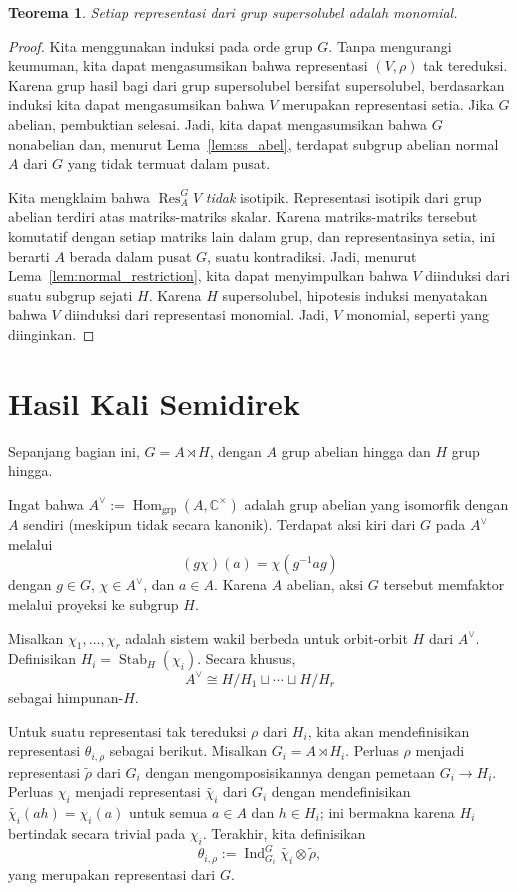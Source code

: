 \documentclass[12pt]{article}
\theoremstyle{plain}
\newtheorem{theorem}{Teorema}[section]
\theoremstyle{definition}
\theoremstyle{remark}
\numberwithin{equation}{section}
\begin{document}
\begin{theorem} \label{thm:ss_monomial}
Setiap representasi dari grup supersolubel adalah monomial.
\end{theorem}

\begin{proof}
Kita menggunakan induksi pada orde grup $G$.
Tanpa mengurangi keumuman, kita dapat mengasumsikan bahwa representasi
$(V,\rho)$ tak tereduksi.
Karena grup hasil bagi dari grup supersolubel bersifat supersolubel,
berdasarkan induksi kita dapat mengasumsikan bahwa $V$ merupakan representasi setia.
Jika $G$ abelian, pembuktian selesai.
Jadi, kita dapat mengasumsikan bahwa $G$ nonabelian dan, menurut Lema~\ref{lem:ss_abel},
terdapat subgrup abelian normal $A$ dari $G$ yang tidak termuat dalam pusat.

Kita mengklaim bahwa $\operatorname{Res}^G_A V$ \emph{tidak} isotipik.
Representasi isotipik dari grup abelian terdiri atas matriks-matriks
skalar. Karena matriks-matriks tersebut komutatif dengan setiap matriks lain dalam grup,
dan representasinya setia, ini berarti $A$ berada dalam pusat
$G$, suatu kontradiksi.
Jadi, menurut Lema~\ref{lem:normal_restriction},
kita dapat menyimpulkan bahwa $V$ diinduksi dari suatu subgrup sejati $H$.
Karena $H$ supersolubel, hipotesis induksi menyatakan bahwa
$V$ diinduksi dari representasi monomial.
Jadi, $V$ monomial, seperti yang diinginkan.
\end{proof}

\section{Hasil Kali Semidirek}

Sepanjang bagian ini, $G = A \rtimes H$,
dengan $A$ grup abelian hingga dan $H$ grup hingga.

Ingat bahwa $A^\vee :=
\operatorname{Hom}_{\mathrm{grp}}(A,\mathbb{C}^\times)$
adalah grup abelian yang isomorfik dengan $A$ sendiri (meskipun tidak
secara kanonik).
Terdapat aksi kiri dari $G$ pada $A^\vee$ melalui
\[
(g\chi)(a)=\chi(g^{-1}ag)
\]
dengan $g \in G$, $\chi \in A^\vee$, dan $a \in A$.
Karena $A$ abelian, aksi $G$ tersebut memfaktor melalui proyeksi
ke subgrup $H$.

Misalkan $\chi_1,\ldots, \chi_r$ adalah sistem wakil berbeda
untuk orbit-orbit $H$ dari $A^\vee$. Definisikan
$H_i=\operatorname{Stab}_H(\chi_i)$.
Secara khusus,
\[
A^\vee \cong H/H_1 \sqcup \cdots \sqcup H/H_r
\]
sebagai himpunan-$H$.

Untuk suatu representasi tak tereduksi $\rho$ dari $H_i$,
kita akan mendefinisikan representasi $\theta_{i,\rho}$ sebagai berikut.
Misalkan $G_i= A \rtimes H_i$.
Perluas $\rho$ menjadi representasi $\widetilde{\rho}$ dari $G_i$
dengan mengomposisikannya dengan pemetaan $G_i \to H_i$.
Perluas $\chi_i$ menjadi representasi $\widetilde{\chi_i}$ dari $G_i$
dengan mendefinisikan $\widetilde{\chi_i}(ah)=\chi_i(a)$
untuk semua $a \in A$ dan $h \in H_i$; ini bermakna karena
$H_i$ bertindak secara trivial pada $\chi_i$.
Terakhir, kita definisikan
\[
\theta_{i,\rho} := \operatorname{Ind}_{G_i}^G
\widetilde{\chi_i} \otimes \widetilde{\rho},
\]
yang merupakan representasi dari $G$.
\end{document}
